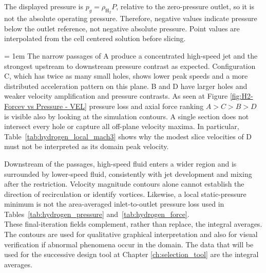 The displayed pressure is $p_g=\rho_{\mathrm{H}_2}P$, relative to the zero-pressure outlet, so it is not the absolute operating pressure. Therefore, negative values indicate pressure below the outlet reference, not negative absolute pressure. Point values are interpolated from the cell centered solution before slicing.

\begingroup \emergencystretch = 1em
The narrow passages of A produce a concentrated high-speed jet and the strongest upstream to downstream pressure contrast as expected. Configuration C, which has twice as many small holes, shows lower peak speeds and a more distributed acceleration pattern on this plane. B and D have larger holes and weaker velocity amplification and pressure contrasts. As seen at Figure \ref{fig:H2-Forcev vs Pressure - VEL} pressure loss and axial force ranking $A>C>B>D$ is visible also by looking at the simulation contours. A single section does not intersect every hole or capture all off-plane velocity maxima. In particular, Table~\ref{tab:hydrogen_local_mach3} shows why the modest slice velocities of D must not be interpreted as its domain peak velocity.
\par\endgroup

Downstream of the passages, high-speed fluid enters a wider region and is surrounded by lower-speed fluid, consistently with jet development and mixing after the restriction. Velocity magnitude contours alone cannot establish the direction of recirculation or identify vortices. Likewise, a local static-pressure minimum is not the area-averaged inlet-to-outlet pressure loss used in Tables~\ref{tab:hydrogen_pressure} and~\ref{tab:hydrogen_force}.\\

These final-iteration fields complement, rather than replace, the integral averages.  The contours are used for qualitative graphical interpretation and also for visual verification if abnormal phenomena occur in the domain. The data that will be used for the successive design tool at Chapter \ref{ch:selection_tool} are the integral averages.

